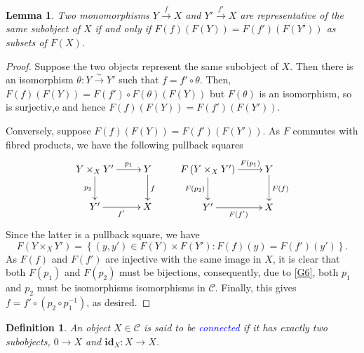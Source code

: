 \documentclass[10pt]{article}
\theoremstyle{thmstyle}
\newtheorem{lemma}[theorem]{Lemma}
\theoremstyle{defstyle}
\newtheorem{definition}[theorem]{Definition}
\newcommand{\id}{\mathbf{id}}
\newcommand{\scrC}{\mathscr{C}} %
\newcommand{\define}[1]{\textcolor{blue}{\textit{#1}}}
\begin{document}
\begin{lemma}
    Two monomorphisms $Y\xrightarrow{f} X$ and $Y'\xrightarrow{f'} X$ are representative of the same subobject of $X$ if and only if $F(f)\left(F(Y)\right) = F(f')\left(F(Y')\right)$ as subsets of $F(X)$.
\end{lemma}
\begin{proof}
    Suppose the two objects represent the same subobject of $X$. Then there is an isomorphism $\theta: Y\xrightarrow{\sim} Y'$ such that $f = f'\circ\theta$. Then, $F(f)\left(F(Y)\right) = F(f')\circ F(\theta)\left(F(Y)\right)$ but $F(\theta)$ is an isomorphism, so is surjectiv,e and hence $F(f)\left(F(Y)\right) = F(f')\left(F(Y')\right)$.

    Conversely, suppose $F(f)\left(F(Y)\right) = F(f')\left(F(Y')\right)$. As $F$ commutes with fibred products, we have the following pullback squares 
    \begin{equation*}
        \xymatrix {
            Y\times_X Y'\ar[r]^-{p_1}\ar[d]_{p_2} & Y\ar[d]^f\\
            Y'\ar[r]_{f'} & X
        }
        \qquad 
        \xymatrix {
            F\left(Y\times_X Y'\right)\ar[r]^-{F(p_1)}\ar[d]_{F(p_2)} & Y\ar[d]^{F(f)}\\
            Y'\ar[r]_{F(f')} & X
        }
    \end{equation*}
    Since the latter is a pullback square, we have 
    \begin{equation*}
        F\left(Y\times_X Y'\right) = \left\{(y, y')\in F(Y)\times F(Y')\colon F(f)(y) = F(f')(y')\right\}.
    \end{equation*}
    As $F(f)$ and $F(f')$ are injective with the same image in $X$, it is clear that both $F(p_1)$ and $F(p_2)$ must be bijections, consequently, due to \ref{G6}, both $p_1$ and $p_2$ must be isomorphisms isomorphisms in $\scrC$. Finally, this gives $f = f'\circ(p_2\circ p_1^{-1})$, as desired.
\end{proof}

\begin{definition}
    An object $X\in\scrC$ is said to be \define{connected} if it has exactly two subobjects, $0\to X$ and $\id_X: X\to X$.
\end{definition}
\end{document}
